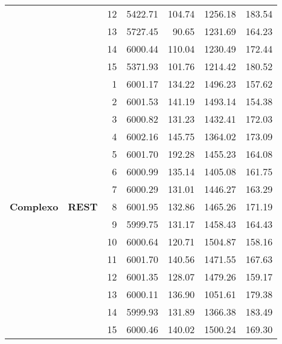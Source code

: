 \begin{longtable}{@{} llrrrrr @{}}
        & & 12 & 5422.71 & 104.74 & 1256.18 & 183.54 \\
        & & 13 & 5727.45 & 90.65 & 1231.69 & 164.23 \\
        & & 14 & 6000.44 & 110.04 & 1230.49 & 172.44 \\
        & & 15 & 5371.93 & 101.76 & 1214.42 & 180.52 \\
    \cline{2-7}
    \multirow{15}{*}{\textbf{Complexo}} & \multirow{15}{*}{\textbf{REST}} 
        & 1 & 6001.17 & 134.22 & 1496.23 & 157.62 \\
        & & 2 & 6001.53 & 141.19 & 1493.14 & 154.38 \\
        & & 3 & 6000.82 & 131.23 & 1432.41 & 172.03 \\
        & & 4 & 6002.16 & 145.75 & 1364.02 & 173.09 \\
        & & 5 & 6001.70 & 192.28 & 1455.23 & 164.08 \\
        & & 6 & 6000.99 & 135.14 & 1405.08 & 161.75 \\
        & & 7 & 6000.29 & 131.01 & 1446.27 & 163.29 \\
        & & 8 & 6001.95 & 132.86 & 1465.26 & 171.19 \\
        & & 9 & 5999.75 & 131.17 & 1458.43 & 164.43 \\
        & & 10 & 6000.64 & 120.71 & 1504.87 & 158.16 \\
        & & 11 & 6001.70 & 140.56 & 1471.55 & 167.63 \\
        & & 12 & 6001.35 & 128.07 & 1479.26 & 159.17 \\
        & & 13 & 6000.11 & 136.90 & 1051.61 & 179.38 \\
        & & 14 & 5999.93 & 131.89 & 1366.38 & 183.49 \\
        & & 15 & 6000.46 & 140.02 & 1500.24 & 169.30 \\

\end{longtable}